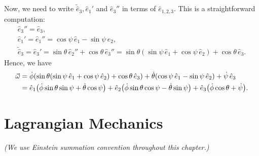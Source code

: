 \documentclass{article}
\begin{document}
Now, we need to write $\tilde{\hat{e}}_3, \hat{e}_1'$ and $\hat{e}_3''$ in terms of $\hat{e}_{1,2,3}$. This is a straightforward computation:
\begin{gather*}
    \hat{e}_3'' = \hat{e}_3, \\
    \hat{e}_1' = \hat{e}_1'' = \cos\psi \, \hat{e}_1 - \sin\psi\, \hat{e}_2, \\
    \tilde{\hat{e}}_3 = \hat{e}_3' = \sin\theta \, \hat{e}_2'' + \cos\theta \, \hat{e}_3'' = \sin\theta (\sin\psi \, \hat{e}_1 + \cos\psi \, \hat{e}_2) + \cos \theta \,\hat{e}_3.
\end{gather*}
Hence, we have
\begin{align}
    \begin{split}
        \vec{\omega} &= \dot{\phi} \qty(\sin\theta (\sin\psi \, \hat{e}_1 + \cos\psi \, \hat{e}_2) + \cos \theta \,\hat{e}_3) + \dot{\theta} \qty(\cos\psi \, \hat{e}_1 - \sin\psi\, \hat{e}_2) + \dot{\psi} \, \hat{e}_3 \\
        &= \hat{e}_1 \qty(\dot{\phi} \sin\theta \sin \psi + \dot{\theta} \cos\psi) + \hat{e}_2 \qty(\dot{\phi} \sin\theta \cos\psi - \dot{\theta} \sin\psi) + \hat{e}_3 \qty(\dot{\phi} \cos\theta + \dot{\psi}).
    \end{split}
\end{align}

\newpage

\section{Lagrangian Mechanics}
\textit{(We use Einstein summation convention throughout this chapter.)}
\end{document}
